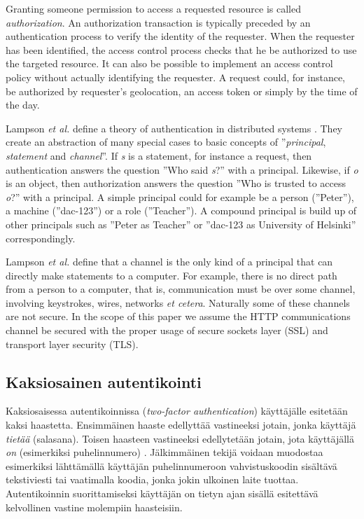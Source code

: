\documentclass[english,gradu]{tktltiki}
\begin{document}
  Granting someone permission to access a requested resource is called \emph{authorization}. An authorization transaction is typically preceded by an authentication process to verify the identity of the requester. When the requester has been identified, the access control process checks that he be authorized to use the targeted resource. It can also be possible to implement an access control policy without actually identifying the requester. A request could, for instance, be authorized by requester's geolocation, an access token or simply by the time of the day.

  Lampson \emph{et al.} define a theory of authentication in distributed systems
\cite{lampson_distributed_1992}. They create an abstraction of many special
cases to basic concepts of ''\emph{principal}, \emph{statement} and \emph{channel}''. If \emph{s}
is a statement, for instance a request, then authentication answers the
question ''Who said \emph{s}?'' with a principal. Likewise, if \emph{o} is an
object, then authorization answers the question ''Who is trusted to access
\emph{o}?'' with a principal. A simple principal could for example be a
person (''Peter''), a machine (''dac-123'') or a role (''Teacher''). A
compound principal is build up of other principals such as ''Peter as
Teacher'' or ''dac-123 as University of Helsinki'' correspondingly.

          Lampson \emph{et al.} \cite{lampson_distributed_1992} define that a channel is the only kind of a principal that can directly make statements to a computer. For example, there is no direct path from a person to a computer, that is, communication must be over some channel,
involving keystrokes, wires, networks \emph{et cetera}. Naturally some of these channels are not secure. In the scope of this paper we assume
the HTTP communications channel be secured with the proper usage of secure sockets layer (SSL) and transport layer security (TLS).




\subsection{Kaksiosainen autentikointi}

Kaksiosaisessa autentikoinnissa (\emph{two-factor authentication}) käyttäjälle esitetään kaksi haastetta. Ensimmäinen haaste edellyttää vastineeksi jotain, jonka käyttäjä \emph{tietää} (salasana). Toisen haasteen vastineeksi edellytetään jotain, jota käyttäjällä \emph{on} (esimerkiksi puhelinnumero) \cite{NIST_SP800-63, google_2step_2010}. Jälkimmäinen tekijä voidaan muodostaa esimerkiksi lähttämällä käyttäjän puhelinnumeroon vahvistuskoodin sisältävä tekstiviesti tai vaatimalla koodia, jonka jokin ulkoinen laite tuottaa. Autentikoinnin suorittamiseksi käyttäjän on tietyn ajan sisällä esitettävä kelvollinen vastine molempiin haasteisiin.
\end{document}
